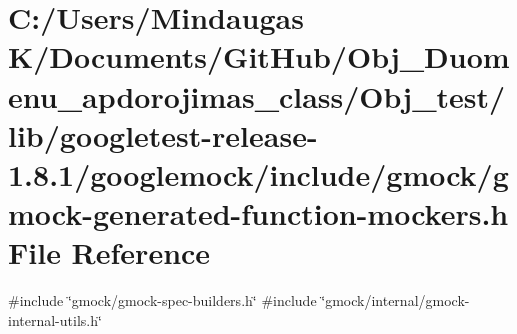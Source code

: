 \hypertarget{_obj__test_2lib_2googletest-release-1_88_81_2googlemock_2include_2gmock_2gmock-generated-function-mockers_8h}{}\section{C\+:/\+Users/\+Mindaugas K/\+Documents/\+Git\+Hub/\+Obj\+\_\+\+Duomenu\+\_\+apdorojimas\+\_\+class/\+Obj\+\_\+test/lib/googletest-\/release-\/1.8.1/googlemock/include/gmock/gmock-\/generated-\/function-\/mockers.h File Reference}
\label{_obj__test_2lib_2googletest-release-1_88_81_2googlemock_2include_2gmock_2gmock-generated-function-mockers_8h}
{\ttfamily \#include \char`\"{}gmock/gmock-\/spec-\/builders.\+h\char`\"{}}\newline
{\ttfamily \#include \char`\"{}gmock/internal/gmock-\/internal-\/utils.\+h\char`\"{}}\newline
